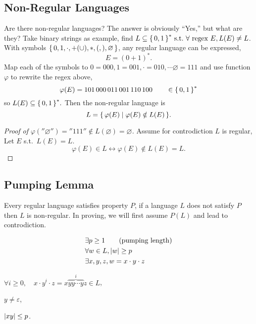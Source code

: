 

\subsection{Non-Regular Languages}

Are there non-regular languages? 
The answer is obviously ``Yes,'' but what are they?
Take binary strings as example, find
$L \subseteq \set{0,1}^*\ \text{s.t.}\ \forall\ \text{regex}\ E, L(E) \neq L$.
With symbols 
${ \left\{\, 0,1,\cdot,+(\cup),*,(,),\varnothing \,\right\} }$,
any regular language can be expressed,
\[
    E = (0+1)^*.
\]
Map each of the symbols to
$
0 = 000,
1 = 001,
\cdot = 010,
\cdots
\varnothing = 111
$
and use function $\varphi$ to rewrite the regex above,
\[
    \varphi(E) = 101\,000\,011\,001\,110\,100 \qquad \in { \left\{\,0,1\,\right\} }^*
\]
so 
$
L(E) \subseteq { \left\{\,0,1\,\right\} }^*.
$
Then the non-regular language is 
\[
    L = { \left\{\, \varphi(E) \mid \varphi(E) \notin L(E) \,\right\} }.
\]
\begin{proof}[
    Proof of $\varphi(''\varnothing'') = ''111'' \notin L(\varnothing) = \varnothing$
]
    Assume for controdiction $L$ is regular,  \\
    Let $E$ s.t.\ $L(E) = L$.  \\
    \[
        \varphi(E) \in L \leftrightarrow \varphi(E) \notin L(E) = L.
    \]
\end{proof}

\subsection{Pumping Lemma}

Every regular language satisfies property $P$,
if a language $L$ does not satisfy $P$ then $L$ is non-regular.
In proving, we will first assume $P(L)$ and lead to controdiction.

\begin{definition}[Property $P$]
    \begin{align*}
        &\exists p \ge 1 \qquad \text{(pumping length)}     \\
        &\forall w \in L, { \left\lvert w \right\rvert } \ge p                     \\
        &\exists x,y,z, w = x \cdot y \cdot z               \\
    \end{align*}
    \begin{compactitem}
    \item
        $
        \forall i \ge 0, \quad
        x \cdot y^i \cdot z = x \overbrace{yy \cdots y}^i z \in L
        $,
    \item
        $
        y \neq \varepsilon
        $,
    \item
        $
        { \left\lvert xy \right\rvert } \le p
        $.
    \end{compactitem}
\end{definition}

